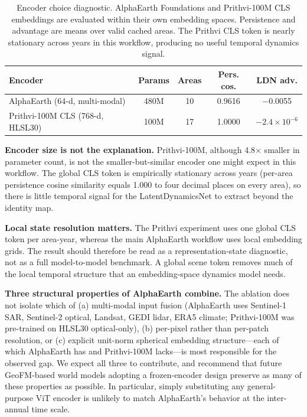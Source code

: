 \documentclass{article}
\begin{document}
\begin{table}[htbp]
\centering
\caption{Encoder choice diagnostic. AlphaEarth Foundations and Prithvi-100M CLS embeddings are evaluated within their own embedding spaces. Persistence and advantage are means over valid cached areas. The Prithvi CLS token is nearly stationary across years in this workflow, producing no useful temporal dynamics signal.}
\label{tab:encoder_ablation}
\footnotesize
\begin{tabular*}{\textwidth}{@{\extracolsep{\fill}}lcccc@{}}
\toprule
Encoder & Params & Areas & Pers. cos. & LDN adv. \\
\midrule
AlphaEarth (64-d, multi-modal) & 480M & 10 & 0.9616 & $-$0.0055 \\
Prithvi-100M CLS (768-d, HLSL30) & 100M & 17 & 1.0000 & $-2.4 \times 10^{-6}$ \\
\bottomrule
\end{tabular*}
\end{table}

\textbf{Encoder size is not the explanation.} Prithvi-100M, although 4.8$\times$ smaller in parameter count, is not the smaller-but-similar encoder one might expect in this workflow. The global CLS token is empirically stationary across years (per-area persistence cosine similarity equals 1.000 to four decimal places on every area), so there is little temporal signal for the LatentDynamicsNet to extract beyond the identity map.

\textbf{Local state resolution matters.} The Prithvi experiment uses one global CLS token per area-year, whereas the main AlphaEarth workflow uses local embedding grids. The result should therefore be read as a representation-state diagnostic, not as a full model-to-model benchmark. A global scene token removes much of the local temporal structure that an embedding-space dynamics model needs.

\textbf{Three structural properties of AlphaEarth combine.} The ablation does not isolate which of (a) multi-modal input fusion (AlphaEarth uses Sentinel-1 SAR, Sentinel-2 optical, Landsat, GEDI lidar, ERA5 climate; Prithvi-100M was pre-trained on HLSL30 optical-only), (b) per-pixel rather than per-patch resolution, or (c) explicit unit-norm spherical embedding structure---each of which AlphaEarth has and Prithvi-100M lacks---is most responsible for the observed gap. We expect all three to contribute, and recommend that future GeoFM-based world models adopting a frozen-encoder design preserve as many of these properties as possible. In particular, simply substituting any general-purpose ViT encoder is unlikely to match AlphaEarth's behavior at the inter-annual time scale.
\end{document}
